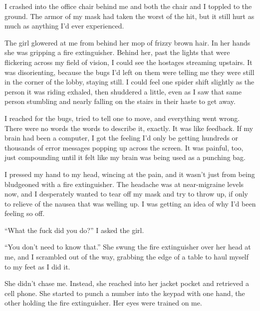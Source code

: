 





I crashed into the office chair behind me and both the chair and I toppled to the ground.  The armor of my mask had taken the worst of the hit, but it still hurt as much as anything I'd ever experienced.



The girl glowered at me from behind her mop of frizzy brown hair.  In her hands she was gripping a fire extinguisher.  Behind her, past the lights that were flickering across my field of vision, I could see the hostages streaming upstairs.  It was disorienting, because the bugs I'd left on them were telling me they were still in the corner of the lobby, staying still.  I could feel one spider shift slightly as the person it was riding exhaled, then shuddered a little, even as I saw that same person stumbling and nearly falling on the stairs in their haste to get away.



I reached for the bugs, tried to tell one to move, and everything went wrong.  There were no words the words to describe it, exactly.  It was like feedback.  If my brain had been a computer, I got the feeling I'd only be getting hundreds or thousands of error messages popping up across the screen.  It was painful, too, just compounding until it felt like my brain was being used as a punching bag.



I pressed my hand to my head, wincing at the pain, and it wasn't just from being bludgeoned with a fire extinguisher.  The headache was at near-migraine levels now, and I desperately wanted to tear off my mask and try to throw up, if only to relieve of the nausea that was welling up.  I was getting an idea of why I'd been feeling so off.



``What the fuck did you do?'' I asked the girl.



``You don't need to know that.''  She swung the fire extinguisher over her head at me, and I scrambled out of the way, grabbing the edge of a table to haul myself to my feet as I did it.



She didn't chase me.  Instead, she reached into her jacket pocket and retrieved a cell phone.  She started to punch a number into the keypad with one hand, the other holding the fire extinguisher.  Her eyes were trained on me.



